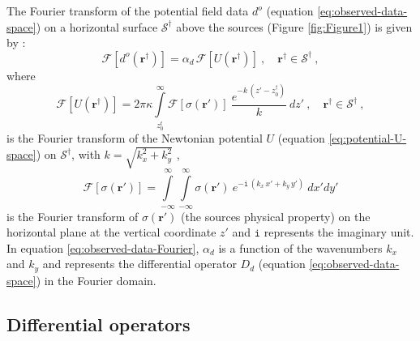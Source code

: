 \documentclass[manuscript,noblind]{geophysics}
\begin{document}
	The Fourier transform of the potential field data $d^{o}$ (equation \ref{eq:observed-data-space}) 
	on a horizontal surface $\mathcal{S}^{\dagger}$ above the sources (Figure \ref{fig:Figure1}) is given 
	by \citep[e.g.,][]{bhattacharyya1967,gunn1975}:
	\begin{equation}
		\mathcal{F} [ d^{o}(\mathbf{r}^{\dagger}) ] =
		\alpha_{d} \, \mathcal{F} [ U(\mathbf{r}^{\dagger}) ] \: ,
		\quad \mathbf{r}^{\dagger} \in \mathcal{S}^{\dagger} \: ,
		\label{eq:observed-data-Fourier}
	\end{equation}
	where 
	\begin{equation}
		\mathcal{F} [ U(\mathbf{r}^{\dagger}) ] = 2 \pi \kappa 
		\int\limits_{z^{t}_{0}}^{\infty}
		\mathcal{F} [ \sigma(\mathbf{r}') ] \:
		\frac{e^{- k \, (z' - z^{\dagger}_{0})}}{k}
		\: dz' \: , 
		\quad \mathbf{r}^{\dagger} \in \mathcal{S}^{\dagger} \: ,
		\label{eq:potential-U-Fourier}
	\end{equation}
	is the Fourier transform of the Newtonian potential 
	$U$ (equation \ref{eq:potential-U-space}) on $\mathcal{S}^{\dagger}$, with $k = \sqrt{k_{x}^{2} + k_{y}^{2}}$ ,
	\begin{equation}
		\mathcal{F} [ \sigma(\mathbf{r}') ] = 
		\int\limits_{-\infty}^{\infty}\int\limits_{-\infty}^{\infty}
		\sigma(\mathbf{r}') \: e^{-\mathtt{i} \, (k_{x} \, x' + k_{y} \, y')}
		\: dx'dy'
		\label{eq:sigma-Fourier}
	\end{equation}
	is the Fourier transform of $\sigma(\mathbf{r}')$ 
	(the sources physical property) on the horizontal plane at the vertical
	coordinate $z'$ and $\mathtt{i}$ represents the imaginary unit.
	In equation \ref{eq:observed-data-Fourier}, $\alpha_{d}$ is a function of the 
	wavenumbers $k_{x}$ and $k_{y}$ and represents the differential operator 
	$D_{d}$ (equation \ref{eq:observed-data-space}) in the Fourier domain.
	
	\subsection{Differential operators}
	\label{sec:diff_operators}
	
\end{document}
